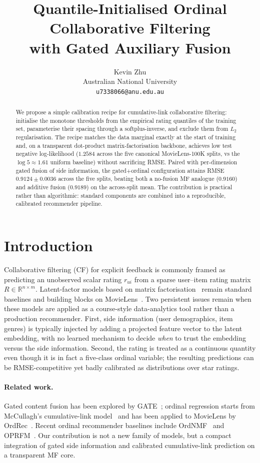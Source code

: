 \documentclass{article} %
\title{Quantile-Initialised Ordinal Collaborative Filtering\\ with Gated Auxiliary Fusion}
\author{
  Kevin Zhu \\ Australian National University \\ \texttt{u7338066@anu.edu.au}
}
\begin{document}
\maketitle

\begin{abstract}
We propose a simple calibration recipe for cumulative-link collaborative
filtering: initialise the monotone thresholds from the empirical rating
quantiles of the training set, parameterise their spacing through a
softplus-inverse, and exclude them from $L_2$ regularisation. The recipe
matches the data marginal exactly at the start of training and, on a
transparent dot-product matrix-factorisation backbone, achieves low
test negative log-likelihood ($1.2584$ across the five canonical
MovieLens-100K splits, vs the $\log 5{\approx}1.61$ uniform baseline)
without sacrificing RMSE. Paired with per-dimension gated fusion of side
information, the gated$+$ordinal configuration attains
RMSE $0.9124\pm0.0036$ across the five splits, beating both a no-fusion MF
analogue ($0.9160$) and additive fusion ($0.9189$) on the across-split mean.
The contribution is practical rather than algorithmic: standard components
are combined into a reproducible, calibrated recommender pipeline.
\end{abstract}

\section{Introduction}
\label{sec:intro}

Collaborative filtering (CF) for explicit feedback is commonly framed as
predicting an unobserved scalar rating $r_{ui}$ from a sparse user--item rating
matrix $R\in\mathbb{R}^{n\times m}$. Latent-factor models based on matrix
factorisation~\cite{koren2009mf} remain standard baselines and building blocks
on MovieLens~\cite{harper2015movielens}.
Two persistent issues remain when these models are applied as a course-style
data-analytics tool rather than a production recommender. First, side
information (user demographics, item genres) is typically injected by adding a
projected feature vector to the latent embedding, with no learned mechanism to
decide \emph{when} to trust the embedding versus the side information. Second,
the rating is treated as a continuous quantity even though it is in fact a
five-class ordinal variable; the resulting predictions can be RMSE-competitive
yet badly calibrated as distributions over star ratings.

\paragraph{Related work.}
Gated content fusion has been explored by GATE~\cite{ma2019gate}; ordinal
regression starts from McCullagh's cumulative-link model~\cite{mccullagh1980ordinal}
and has been applied to MovieLens by OrdRec~\cite{koren2011ordrec}. Recent
ordinal recommender baselines include OrdNMF~\cite{gouvert2020ordnmf} and
OPRFM~\cite{zaman2025oprfm}. Our contribution is not a new family of
models, but a compact integration of gated side information and calibrated
cumulative-link prediction on a transparent MF core.
\end{document}
